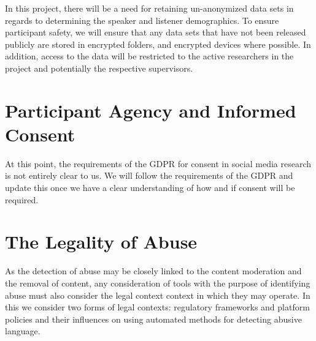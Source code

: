 In this project, there will be a need for retaining un-anonymized data sets in regards to determining the speaker and listener demographics. To ensure participant safety, we will ensure that any data sets that have not been released publicly are stored in encrypted folders, and encrypted devices where possible. In addition, access to the data will be restricted to the active researchers in the project and potentially the respective supervisors.

\section{Participant Agency and Informed Consent}
At this point, the requirements of the GDPR for consent in social media research is not entirely clear to us. We will follow the requirements of the GDPR and update this once we have a clear understanding of how and if consent will be required.
%

\section{The Legality of Abuse}

As the detection of abuse may be closely linked to the content moderation and the removal of content, any consideration of tools with the purpose of identifying abuse must also consider the legal context context in which they may operate. In this we consider two forms of legal contexts: regulatory frameworks and platform policies and their influences on using automated methods for detecting abusive language.

